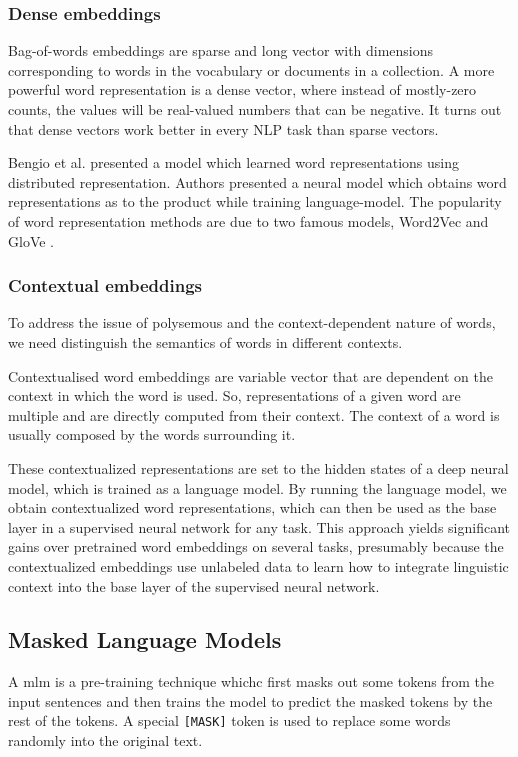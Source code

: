 \subsubsection{Dense embeddings}\label{subsubsec:static-embeddings}
Bag-of-words embeddings are sparse and long vector with dimensions corresponding to words in the vocabulary or documents in a collection.
A more powerful word representation is a dense vector, where instead of mostly-zero counts, the values will be real-valued numbers that can be negative.
It turns out that dense vectors work better in every NLP task than sparse vectors.

Bengio et al. \cite{conf/nips/BengioDV00} presented a model which learned word representations using distributed
representation. Authors presented a neural model which obtains word representations as to
the product while training \gls{language-model}.
The popularity of word representation methods are due to two famous models, Word2Vec
\cite{mikolov2013efficient} and GloVe \cite{pennington2014glove}.

\subsubsection{Contextual embeddings}\label{subsubsec:contextual-embeddings}
To address the issue of polysemous and the context-dependent nature of words, we need
distinguish the semantics of words in different contexts.

Contextualised word embeddings are variable vector that are dependent on the context in which the word is used.
So, representations of a given word are multiple and are
directly computed from their context. The context of a
word is usually composed by the words surrounding it.

These contextualized representations are set to the hidden states of a deep neural model, which is trained as a language model.
By running the language model, we obtain contextualized word representations, which can then be used as the base layer in a supervised neural network for any task. This approach yields significant gains over pretrained word embeddings on several tasks, presumably because the contextualized embeddings use unlabeled data to learn how to integrate linguistic context into the base layer of the supervised neural network.



\subsection{Masked Language Models}\label{subsec:masked-language-models}
A \acrfull{mlm} is a pre-training technique whichc first masks out some tokens from the
input sentences and then trains the model to predict the masked
tokens by the rest of the tokens. A special \texttt{[MASK]} token is used to replace some words randomly into the original text.

